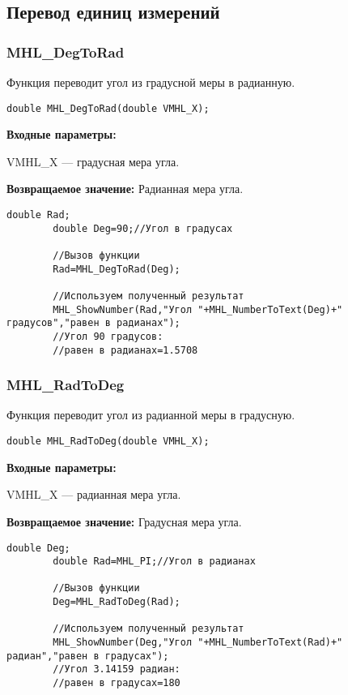 \documentclass[a4paper,12pt]{article}
\begin{document}
\subsection{Перевод единиц измерений}

\subsubsection{MHL\_DegToRad}\label{MHL_DegToRad}

Функция переводит угол из градусной меры в радианную.


\begin{lstlisting}[label=code_syntax_MHL_DegToRad,caption=Синтаксис]
double MHL_DegToRad(double VMHL_X);
\end{lstlisting}

\textbf{Входные параметры:}

 VMHL\_X --- градусная мера угла.

\textbf{Возвращаемое значение:}
Радианная мера угла.


\begin{lstlisting}[label=code_use_MHL_DegToRad,caption=Пример использования]
        double Rad;
        double Deg=90;//Угол в градусах

        //Вызов функции
        Rad=MHL_DegToRad(Deg);

        //Используем полученный результат
        MHL_ShowNumber(Rad,"Угол "+MHL_NumberToText(Deg)+" градусов","равен в радианах");
        //Угол 90 градусов:
        //равен в радианах=1.5708
\end{lstlisting}

\subsubsection{MHL\_RadToDeg}\label{MHL_RadToDeg}

Функция переводит угол из радианной меры в градусную.


\begin{lstlisting}[label=code_syntax_MHL_RadToDeg,caption=Синтаксис]
double MHL_RadToDeg(double VMHL_X);
\end{lstlisting}

\textbf{Входные параметры:}

 VMHL\_X --- радианная мера угла.

\textbf{Возвращаемое значение:}
Градусная мера угла.


\begin{lstlisting}[label=code_use_MHL_RadToDeg,caption=Пример использования]
        double Deg;
        double Rad=MHL_PI;//Угол в радианах

        //Вызов функции
        Deg=MHL_RadToDeg(Rad);

        //Используем полученный результат
        MHL_ShowNumber(Deg,"Угол "+MHL_NumberToText(Rad)+" радиан","равен в градусах");
        //Угол 3.14159 радиан:
        //равен в градусах=180
\end{lstlisting}
\end{document}
